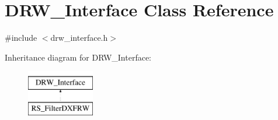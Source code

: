 \hypertarget{classDRW__Interface}{\section{D\-R\-W\-\_\-\-Interface Class Reference}
\label{classDRW__Interface}
}


{\ttfamily \#include $<$drw\-\_\-interface.\-h$>$}

Inheritance diagram for D\-R\-W\-\_\-\-Interface\-:\begin{figure}[H]
\begin{center}
\leavevmode
\includegraphics[height=2.000000cm]{classDRW__Interface}
\end{center}
\end{figure}
